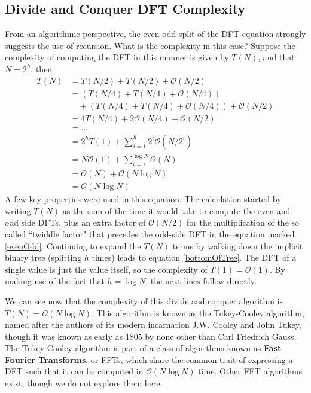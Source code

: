 \subsection{Divide and Conquer DFT Complexity}
From an algorithmic perspective, the even-odd split of the DFT equation strongly suggests the use of recursion. What is the complexity in this case? Suppose the complexity of computing the DFT in this manner is given by $T(N)$, and that $N=2^{h}$, then
\begin{align*}
T(N) &= T(N/2) + T(N/2) + \mathcal{O}(N/2)\\
&= (T(N/4) + T(N/4) + \mathcal{O}(N/4)) \\
&\quad + (T(N/4) + T(N/4) + \mathcal{O}(N/4)) + \mathcal{O}(N/2)\\
&= 4T(N/4) + 2\mathcal{O}(N/4) + \mathcal{O}(N/2)\\
&= ...\\
&= 2^h T(1) + \sum_{i=1}^{h}2^i \mathcal{O}(N/2^i) \tag{**} \label{bottomOfTree}\\
&= N\mathcal{O}(1) + \sum_{i=1}^{\log N} \mathcal{O}(N)\\
&= \mathcal{O}(N) + \mathcal{O}(N\log N)\\
&= \mathcal{O}(N\log N)
\end{align*}
A few key properties were used in this equation. The calculation started by writing $T(N)$ as the sum of the time it would take to compute the even and odd side DFTs, plus an extra factor of $\mathcal{O}(N/2)$ for the multiplication of the so called ``twiddle factor" that precedes the odd-side DFT in the equation marked \ref{evenOdd}. Continuing to expand the $T(N)$ terms by walking down the implicit binary tree (splitting $h$ times) leads to equation \ref{bottomOfTree}. The DFT of a single value is just the value itself, so the complexity of $T(1) = \mathcal{O}(1)$. By making use of the fact that $h = \log N$, the next lines follow directly. 

We can see now that the complexity of this divide and conquer algorithm is $T(N) = \mathcal{O}(N\log N)$. This algorithm is known as the Tukey-Cooley algorithm, named after the authors of its modern incarnation J.W. Cooley and John Tukey, though it was known as early as 1805 by none other than Carl Friedrich Gauss. The Tukey-Cooley algorithm is part of a class of algorithms known as \textbf{Fast Fourier Transforms}, or FFTs, which share the common trait of expressing a DFT such that it can be computed in $\mathcal{O}(N\log N)$ time. Other FFT algorithms exist, though we do not explore them here.

